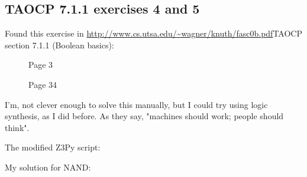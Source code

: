 \subsection{TAOCP 7.1.1 exercises 4 and 5}

Found this exercise in \url{http://www.cs.utsa.edu/~wagner/knuth/fasc0b.pdf}{TAOCP section 7.1.1 (Boolean basics)}:

\begin{figure}[H]
\centering
{}
\caption{Page 3}
\end{figure}

\begin{figure}[H]
\centering
{}
\caption{Page 34}
\end{figure}

I'm, not clever enough to solve this manually, but I could try using logic synthesis, as I did before.
As they say, "machines should work; people should think".

The modified Z3Py script:



My solution for NAND:

